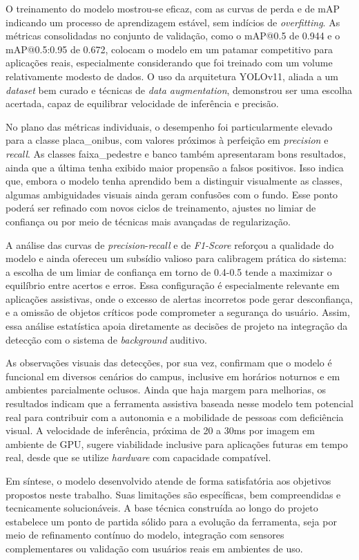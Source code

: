 O treinamento do modelo mostrou-se eficaz, com as curvas de perda e de mAP indicando um processo de aprendizagem estável, sem indícios de \textit{overfitting}. As métricas consolidadas no conjunto de validação, como o mAP@0.5 de 0.944 e o mAP@0.5:0.95 de 0.672, colocam o modelo em um patamar competitivo para aplicações reais, especialmente considerando que foi treinado com um volume relativamente modesto de dados. O uso da arquitetura YOLOv11, aliada a um \textit{dataset} bem curado e técnicas de \textit{data augmentation}, demonstrou ser uma escolha acertada, capaz de equilibrar velocidade de inferência e precisão.

No plano das métricas individuais, o desempenho foi particularmente elevado para a classe placa\_onibus, com valores próximos à perfeição em \textit{precision} e \textit{recall}. As classes faixa\_pedestre e banco também apresentaram bons resultados, ainda que a última tenha exibido maior propensão a falsos positivos. Isso indica que, embora o modelo tenha aprendido bem a distinguir visualmente as classes, algumas ambiguidades visuais ainda geram confusões com o fundo. Esse ponto poderá ser refinado com novos ciclos de treinamento, ajustes no limiar de confiança ou por meio de técnicas mais avançadas de regularização.

A análise das curvas de \textit{precision}-\textit{recall} e de \textit{F1-Score} reforçou a qualidade do modelo e ainda ofereceu um subsídio valioso para calibragem prática do sistema: a escolha de um limiar de confiança em torno de 0.4-0.5 tende a maximizar o equilíbrio entre acertos e erros. Essa configuração é especialmente relevante em aplicações assistivas, onde o excesso de alertas incorretos pode gerar desconfiança, e a omissão de objetos críticos pode comprometer a segurança do usuário. Assim, essa análise estatística apoia diretamente as decisões de projeto na integração da detecção com o sistema de \textit{background} auditivo.

As observações visuais das detecções, por sua vez, confirmam que o modelo é funcional em diversos cenários do campus, inclusive em horários noturnos e em ambientes parcialmente oclusos. Ainda que haja margem para melhorias, os resultados indicam que a ferramenta assistiva baseada nesse modelo tem potencial real para contribuir com a autonomia e a mobilidade de pessoas com deficiência visual. A velocidade de inferência, próxima de 20 a 30ms por imagem em ambiente de GPU, sugere viabilidade inclusive para aplicações futuras em tempo real, desde que se utilize \textit{hardware} com capacidade compatível.

Em síntese, o modelo desenvolvido atende de forma satisfatória aos objetivos propostos neste trabalho. Suas limitações são específicas, bem compreendidas e tecnicamente solucionáveis. A base técnica construída ao longo do projeto estabelece um ponto de partida sólido para a evolução da ferramenta, seja por meio de refinamento contínuo do modelo, integração com sensores complementares ou validação com usuários reais em ambientes de uso.